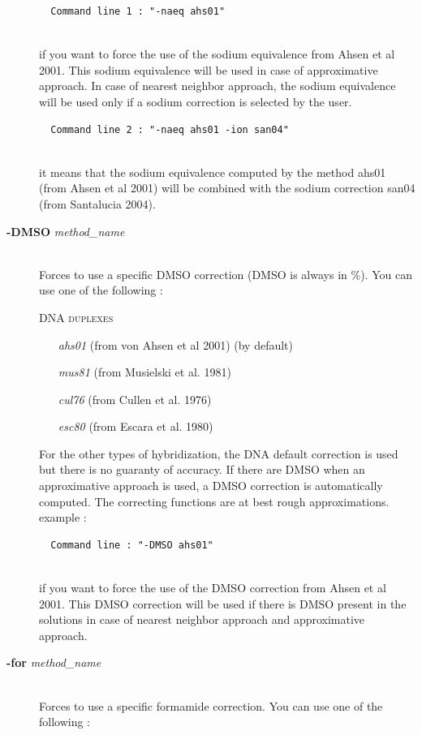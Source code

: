 \documentclass{article}
\begin{document}
\begin{description}
  \begin{verbatim}
  Command line 1 : "-naeq ahs01" 
  
    \end{verbatim}
  if you want to force the use of the sodium equivalence from Ahsen et al 2001. This sodium equivalence 
  will be used in case of approximative approach. In case of nearest neighbor approach, the sodium equivalence 
  will be used only if a sodium correction is selected by the user.
    
    \begin{verbatim}
  Command line 2 : "-naeq ahs01 -ion san04" 
  
    \end{verbatim}
  it means that the sodium equivalence computed by the method ahs01 (from Ahsen et al 2001) will be combined with the 
  sodium correction san04 (from Santalucia 2004).
  
  
\item [\textbf{-DMSO} \textit{method\_name}]\mbox{}\\ 
  Forces to use a specific DMSO correction (DMSO is always in \%).
  You can use one of the following :
  
  \textsc{DNA duplexes}
    \begin{itemize}
    \item [\textit{ahs01}] (from von Ahsen et al 2001)  (by default)
    \item [\textit{mus81}] (from Musielski et al. 1981)
    \item [\textit{cul76}] (from Cullen et al. 1976)	
    \item [\textit{esc80}] (from Escara et al. 1980)		 	 
    \end{itemize}
  For the other types of hybridization, the DNA default correction is used but there is no guaranty of accuracy.
  If there are DMSO when an approximative approach is used, a DMSO correction is automatically computed.
  The correcting functions are  at  best rough  approximations.
  example :
  
  \begin{verbatim}
  Command line : "-DMSO ahs01"  
  
  \end{verbatim} 
  if you want to force the use of the DMSO correction from Ahsen et al 2001. This DMSO correction will be used if there is 
  DMSO present in the solutions in case of nearest neighbor approach and approximative approach.
\item [\textbf{-for} \textit{method\_name}]\mbox{}\\ 
  Forces to use a specific formamide correction.
  You can use one of the following :
  

\end{description}
\end{document}
